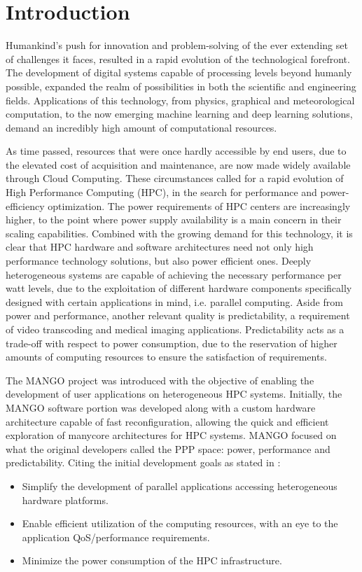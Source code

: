 \chapter{Introduction} \label{ch:introduction}

Humankind's push for innovation and problem-solving of the ever extending set of challenges it faces, resulted in a rapid evolution of the technological forefront. 
The development of digital systems capable of processing levels beyond humanly possible, expanded the realm of possibilities in both the scientific and engineering fields.
Applications of this technology, from physics, graphical and meteorological computation, to the now emerging machine learning and deep learning solutions, demand an incredibly high amount of computational resources.

As time passed, resources that were once hardly accessible by end users, due to the elevated cost of acquisition and maintenance, are now made widely available through Cloud Computing.
These circumstances called for a rapid evolution of High Performance Computing (HPC), in the search for performance and power-efficiency optimization. 
The power requirements of HPC centers are increasingly higher, to the point where power supply availability is a main concern in their scaling capabilities. Combined with the growing demand for this technology, it is clear that HPC hardware and software architectures need not only high performance technology solutions, but also power efficient ones.
Deeply heterogeneous systems are capable of achieving the necessary performance per watt levels, due to the exploitation of different hardware components specifically designed with certain applications in mind, i.e. parallel computing.
Aside from power and performance, another relevant quality is predictability, a requirement of video transcoding and medical imaging applications. Predictability acts as a trade-off with respect to power consumption, due to the reservation of higher amounts of computing resources to ensure the satisfaction of requirements. 

The MANGO project was introduced with the objective of enabling the development of user applications on heterogeneous HPC systems.
Initially, the MANGO software portion was developed along with a custom hardware architecture capable of fast reconfiguration, allowing the quick and efficient exploration of manycore architectures for HPC systems.
MANGO focused on what the original developers called the PPP space: power, performance and predictability. 
Citing the initial development goals as stated in \cite{mango_exploring_manycore_architectures}:
\begin{itemize}
    \item Simplify the development of parallel applications accessing heterogeneous hardware platforms.
    \item Enable efficient utilization of the computing resources, with an eye to the application QoS/performance requirements.
    \item Minimize the power consumption of the HPC infrastructure.
\end{itemize}

